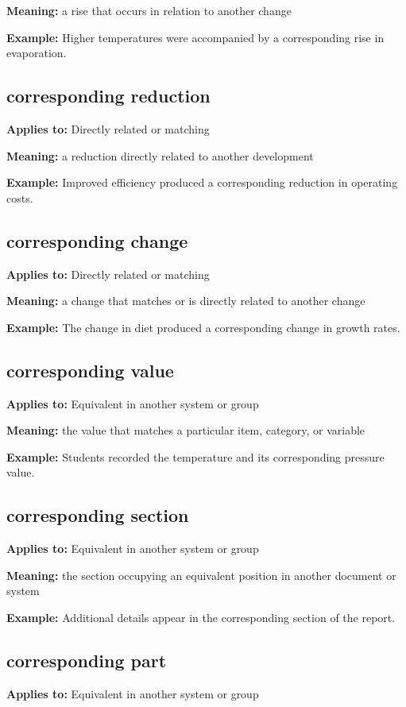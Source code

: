 \documentclass[11pt]{article}
\begin{document}
\textbf{Meaning:} a rise that occurs in relation to another change

\textbf{Example:} Higher temperatures were accompanied by a corresponding rise in evaporation.

\subsection{corresponding reduction}
\textbf{Applies to:} Directly related or matching

\textbf{Meaning:} a reduction directly related to another development

\textbf{Example:} Improved efficiency produced a corresponding reduction in operating costs.

\subsection{corresponding change}
\textbf{Applies to:} Directly related or matching

\textbf{Meaning:} a change that matches or is directly related to another change

\textbf{Example:} The change in diet produced a corresponding change in growth rates.

\subsection{corresponding value}
\textbf{Applies to:} Equivalent in another system or group

\textbf{Meaning:} the value that matches a particular item, category, or variable

\textbf{Example:} Students recorded the temperature and its corresponding pressure value.

\subsection{corresponding section}
\textbf{Applies to:} Equivalent in another system or group

\textbf{Meaning:} the section occupying an equivalent position in another document or system

\textbf{Example:} Additional details appear in the corresponding section of the report.

\subsection{corresponding part}
\textbf{Applies to:} Equivalent in another system or group
\end{document}

